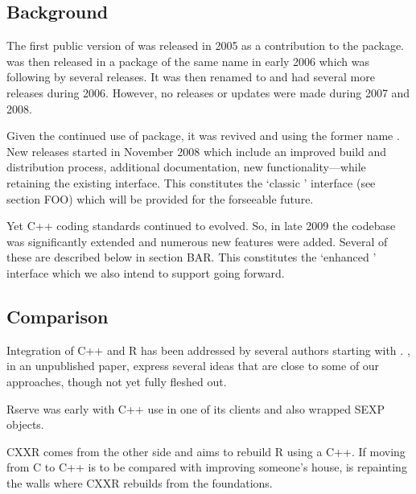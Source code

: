 \subsection{Background}

The first public version of  was released in 2005 as a contribution
to the  package.   was then released in a package of
the same name in early 2006 which was following by several releases. It was
then renamed to  and had several more releases during 2006.
However, no releases or updates were made during 2007 and 2008.  

Given the continued use of package, it was revived and using the former name
. New releases started in November 2008 which include an improved
build and distribution process, additional documentation, new
functionality---while retaining the existing interface.  This constitutes the
`classic ' interface (see section FOO) which will be provided for
the forseeable future.

Yet C++ coding standards continued to evolved. So, in late 2009 the codebase
was significantly extended and numerous new features were added.  Several of
these are described below in section BAR. This constitutes the `enhanced
' interface which we also intend to support going forward.

\subsection{Comparison}

Integration of C++ and R has been addressed by several authors starting with
\cite{batesdebroy01:cppclasses}. \cite{javagailemanly07:r_cpp}, in an
unpublished paper, express several ideas that are close to some of our
approaches, though not yet fully fleshed out.

Rserve \citep{cran:Rserve} was early with C++ use in one 
of its clients and also wrapped SEXP objects. 

CXXR \citep{runnalls09:cxxr} comes from the other side 
and aims to rebuild R using a C++. If moving from C to C++ is to be
compared with improving someone's house,  is repainting the 
walls where CXXR rebuilds from the foundations. 

